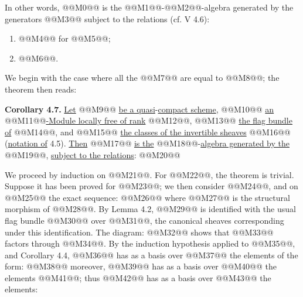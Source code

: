 In other words, @@M0@@ is the @@M1@@-@@M2@@-algebra generated by the generators @@M3@@ subject to the relations (cf. V 4.6):
\begin{enumerate}[label=\textup{\roman*)}]
\item @@M4@@ for @@M5@@;
\item @@M6@@.
\end{enumerate}

We begin with the case where all the @@M7@@ are equal to @@M8@@; the theorem then reads:

\textbf{Corollary 4.7.} \uline{Let} @@M9@@ \uline{be a quasi}-\uline{compact scheme}, @@M10@@ \uline{an} @@M11@@\uline{-Module locally free of rank} @@M12@@, @@M13@@ \uline{the flag bundle of} @@M14@@, and @@M15@@ \uline{the classes of the invertible sheaves} @@M16@@ (\uline{notation of} 4.5). \uline{Then} @@M17@@ \uline{is the} @@M18@@-\uline{algebra generated by the} @@M19@@, \uline{subject to the relations}:
@@M20@@

We proceed by induction on @@M21@@. For @@M22@@, the theorem is trivial. Suppose it has been proved for @@M23@@; we then consider @@M24@@, and on @@M25@@ the exact sequence:
@@M26@@
where @@M27@@ is the structural morphism of @@M28@@. By Lemma 4.2, @@M29@@ is identified with the usual flag bundle @@M30@@ over @@M31@@, the canonical sheaves corresponding under this identification. The diagram:
@@M32@@
shows that @@M33@@ factors through @@M34@@. By the induction hypothesis applied to @@M35@@, and Corollary 4.4, @@M36@@ has as a basis over @@M37@@ the elements of the form:
@@M38@@
moreover, @@M39@@ has as a basis over @@M40@@ the elements @@M41@@; thus @@M42@@ has as a basis over @@M43@@ the elements:

